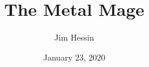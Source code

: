 \documentclass[a4paper,twoside]{scrbook}
\title{The Metal Mage}
\author{Jim Hessin}
\date{January 23, 2020}
\begin{document}
\frontmatter
\maketitle
\tableofcontents

\mainmatter{}
\end{document}
